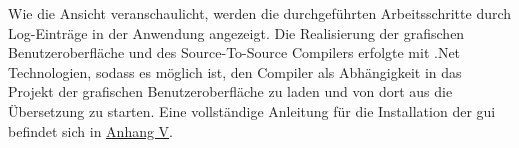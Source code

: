 Wie die Ansicht veranschaulicht, werden die durchgeführten Arbeitsschritte durch Log-Einträge in der Anwendung angezeigt.
Die Realisierung der grafischen Benutzeroberfläche 
und des Source-To-Source Compilers erfolgte mit  .Net Technologien,  sodass es möglich ist,  den Compiler als Abhängigkeit in das Projekt der grafischen Benutzeroberfläche zu laden und von dort aus die Übersetzung zu starten.  Eine vollständige Anleitung für die Installation der \ac{gui}  befindet sich in  \hyperref[chap:Installationsanleitung]{Anhang V}.